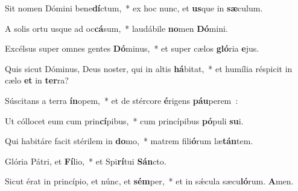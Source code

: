 ﻿\item Sit nomen Dómini bene\textbf{dí}\-ctum,~* ex hoc nunc, et \textbf{us}\-que in \textbf{sæ}culum.
\item A solis ortu usque ad oc\textbf{cá}\-sum,~* laudábile \textbf{no}\-men \textbf{Dó}mini.
\item Excélsus super omnes gentes \textbf{Dó}\-minus,~* et super cælos \textbf{gló}\-ri\-a \textbf{e}jus.
\item Quis sicut Dóminus, Deus noster, qui in altis \textbf{há}\-bitat,~* et humília réspicit in cælo \textbf{et} in \textbf{ter}ra?
\item Súscitans a terra \textbf{ín}\-opem,~* et de stércore \textbf{é}\-rigens \textbf{páu}perem~:
\item Ut cóllocet eum cum prin\textbf{cí}\-pibus,~* cum princípibus \textbf{pó}\-pu\-li \textbf{su}i.
\item Qui habitáre facit stérilem in \textbf{do}\-mo,~* matrem fili\textbf{ó}\-rum læ\textbf{tán}tem.
\item Glória Pátri, et \textbf{Fí}\-lio,~* et Spi\textbf{rí}\-tui \textbf{Sán}cto.
\item Sicut érat in princípio, et núnc, et \textbf{sém}\-per,~* et in sǽcula sæcu\textbf{ló}\-rum. \textbf{A}men.